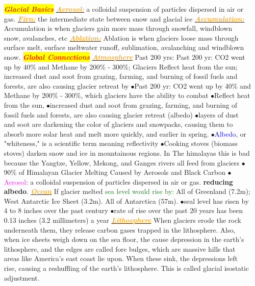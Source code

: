 \documentclass{article}
\author{SBHS Science Olympiad, Gold}
\newcommand{\ddd}{$\bullet$}
\newcommand{\red}[1]{\textcolor{red}{#1}}
\newcommand{\green}[1]{\textcolor{green}{#1}}
\newcommand{\blue}[1]{\textcolor{blue}{#1}}
\newcommand{\pink}[1]{\textcolor{magenta}{#1}}
\newcommand{\orange}[1]{\textcolor{orange}{#1}}
\newcommand{\mysection}[1]{\colorbox{yellow}{\textbf{\textit{\red{#1}}}}}
\newcommand{\mysub}[1]{\underline{\textbf{{\textit{\orange{#1}}}}}}
\newcommand{\mysubsub}[1]{{{\green{#1}}}}
\newcommand{\vocab}[1]{{\pink{#1}}}
\begin{document}
	 \tiny
	\begin{multicols*}{4}
	
		\mysection{Glacial Basics}
		\mysub{Aerosol:} a colloidal suspension of particles dispersed in air or gas.
		\mysub{Firn:} the intermediate state between snow and glacial ice
		\mysub{Accumulation:} Accumulation is when glaciers gain more mass through snowfall, windblown snow, avalanches, etc
		\mysub{Ablation:} Ablation is when glaciers loose mass through surface melt, surface meltwater runoff, sublimation, avalanching and windblown snow.
         \mysection{Global Connections}
		\mysub{Atmosphere}
		Past 200 yrs: Past 200 yr: CO2 went up by 40\% and Methane by 200\% - 300\%; Glaciers Reflect heat from the sun; increased dust and soot from grazing, farming, and burning of fossil fuels and forests, are also causing glacier retreat by
		 \ddd Past 200 yr: CO2 went up by 40\% and Methane by 200\% - 300\%, which glaciers have the ability to combat
       \ddd Reflect heat from the sun, 
        \ddd increased dust and soot from grazing, farming, and burning of fossil fuels and forests, are also causing glacier retreat (albedo)
        \ddd layers of dust and soot are darkening the color of glaciers and snowpacks, causing them to absorb more solar heat and melt more quickly, and earlier in spring.
        \ddd \blue{Albedo}, or "whiteness," is a scientific term meaning reflectivity
        \ddd Cooking stoves (biomass stoves) darken snow and ice in mountainous regions. In The himalayas this is bad because the Yangtze, Yellow, Mekong, and Ganges rivers all feed from glaciers
        \ddd 90\% of Himalayan Glacier Melting Caused by Aerosols and Black Carbon
        \ddd \vocab{Aerosol}: a colloidal suspension of particles dispersed in air or gas.
		\textbf{reducing albedo}.
		\mysub{Ocean} If glacier melted 
		\mysubsub{sea level would rise by: } All of Greenland (7.2m); West Antarctic Ice Sheet (3.2m). All of Antarctica (57m). 
         \ddd seal level has risen by 4 to 8 inches over the past century
         \ddd rate of rise over the past 20 years has been 0.13 inches (3.2 millimeters) a year
		\mysub{Lithosphere} When glaciers erode the rock underneath them, they release carbon gases trapped in the lithosphere. Also, when ice sheets weigh down on the sea floor, the cause depression in the earth's lithosphere, and the edges are called fore bulges, which are massive hills that areas like America's east coast lie upon. When these sink, the depressions left rise, causing a reshuffling of the earth's lithosphere. This is called glacial isostatic adjustment.

\end{multicols*}
\end{document}

